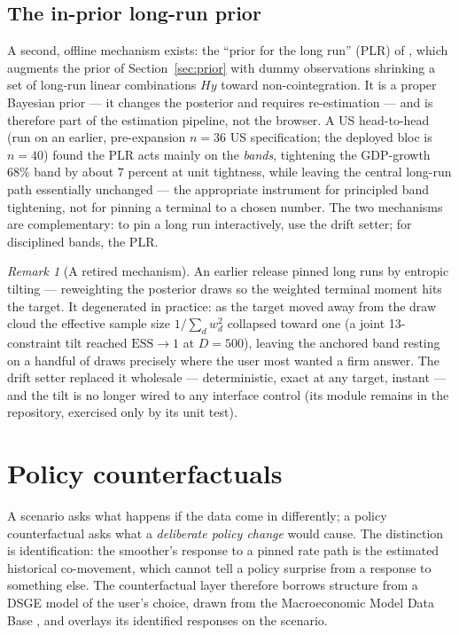 \documentclass[11pt]{article}
\theoremstyle{plain}
\theoremstyle{remark}
\newtheorem{remark}{Remark}
\begin{document}
\subsection{The in-prior long-run prior}\label{sec:plr}

A second, offline mechanism exists: the ``prior for the long run''
(PLR) of \citet{GiannoneLenzaPrimiceri2019}, which augments the prior of
Section~\ref{sec:prior} with dummy observations shrinking a set of
long-run linear combinations $Hy$ toward non-cointegration. It is a
proper Bayesian prior --- it changes the posterior and requires
re-estimation --- and is therefore part of the estimation pipeline, not
the browser. A US head-to-head (run on an earlier, pre-expansion
$n=36$ US specification; the deployed bloc is $n=40$) found the PLR
acts mainly on the \emph{bands}, tightening the GDP-growth 68\% band by
about $7$ percent at unit tightness, while leaving the central long-run
path essentially unchanged --- the appropriate instrument for principled
band tightening, not for pinning a terminal to a chosen number. The two
mechanisms are complementary: to pin a long run interactively, use the
drift setter; for disciplined bands, the PLR.

\begin{remark}[A retired mechanism]\label{rem:tilt}
An earlier release pinned long runs by entropic tilting
\citep{RobertsonTallmanWhiteman2005} --- reweighting the posterior draws
so the weighted terminal moment hits the target. It degenerated in
practice: as the target moved away from the draw cloud the effective
sample size $1/\sum_d w_d^2$ collapsed toward one (a joint 13-constraint
tilt reached $\mathrm{ESS} \to 1$ at $D=500$), leaving the anchored band
resting on a handful of draws precisely where the user most wanted a
firm answer. The drift setter replaced it wholesale --- deterministic,
exact at any target, instant --- and the tilt is no longer wired to any
interface control (its module remains in the repository, exercised only
by its unit test).
\end{remark}

\section{Policy counterfactuals}\label{sec:counterfactual}

A scenario asks what happens if the data come in differently; a policy
counterfactual asks what a \emph{deliberate policy change} would cause.
The distinction is identification: the smoother's response to a pinned
rate path is the estimated historical co-movement, which cannot tell a
policy surprise from a response to something else. The counterfactual
layer therefore borrows structure from a DSGE model of the user's
choice, drawn from the Macroeconomic Model Data Base
\citep[MMB;][]{WielandCwikMuellerSchmidtWolters2012,
WielandAfanasyevaYooKuete2016}, and overlays its identified responses on
the scenario.
\end{document}
